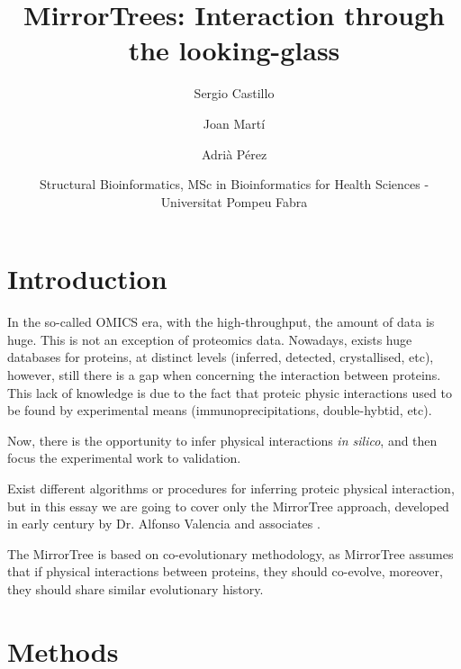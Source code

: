 \documentclass[11pt]{article}
\title{MirrorTrees: Interaction through the looking-glass}
\author{
	Sergio Castillo
	\and
	Joan Martí
	\and
	Adrià Pérez
}
\date{Structural Bioinformatics, MSc in Bioinformatics for Health Sciences - Universitat Pompeu Fabra}
\begin{document}
\maketitle

\section{Introduction}
In the so-called OMICS era, with the high-throughput, the amount of data is huge. This is not an exception of proteomics data. Nowadays, exists huge databases for proteins, at distinct levels (inferred, detected, crystallised, etc), however, still there is a gap when concerning the interaction between proteins. This lack of knowledge is 	 due to the fact that proteic physic interactions used to be found by experimental means (immunoprecipitations, double-hybtid, etc).


Now, there is the opportunity to infer physical interactions \textit{in silico}, and then focus the experimental work to validation.

Exist different algorithms or procedures for inferring proteic physical interaction, but in this essay we are going to cover only the MirrorTree approach, developed in early century by Dr. Alfonso Valencia and associates \cite{Pazos2001}.

The MirrorTree is based on co-evolutionary methodology, as MirrorTree assumes that if physical interactions between proteins, they should co-evolve, moreover, they should share similar evolutionary history.


\section{Methods}
\end{document}
